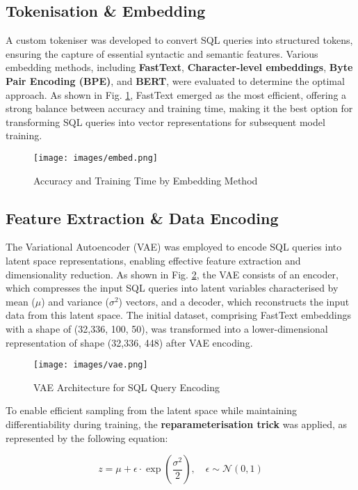 \documentclass[journal]{IEEEtran}
\begin{document}
\subsection{Tokenisation \& Embedding}
A custom tokeniser was developed to convert SQL queries into structured tokens, ensuring the capture of essential syntactic and semantic features. Various embedding methods, including \textbf{FastText}, \textbf{Character-level embeddings}, \textbf{Byte Pair Encoding (BPE)}, and \textbf{BERT}, were evaluated to determine the optimal approach. As shown in Fig. \ref{fig:embed_accuracy}, FastText emerged as the most efficient, offering a strong balance between accuracy and training time, making it the best option for transforming SQL queries into vector representations for subsequent model training.

\begin{figure}[H]
    \centering
    \texttt{[image: images/embed.png]}
    \caption{Accuracy and Training Time by Embedding Method}
    \label{fig:embed_accuracy}
\end{figure}

\subsection{Feature Extraction \& Data Encoding}
The Variational Autoencoder (VAE) was employed to encode SQL queries into latent space representations, enabling effective feature extraction and dimensionality reduction. As shown in Fig. \ref{fig:vae_architecture}, the VAE consists of an encoder, which compresses the input SQL queries into latent variables characterised by mean (\(\mu\)) and variance (\(\sigma^2\)) vectors, and a decoder, which reconstructs the input data from this latent space. The initial dataset, comprising FastText embeddings with a shape of (32,336, 100, 50), was transformed into a lower-dimensional representation of shape (32,336, 448) after VAE encoding.

\begin{figure}[H]
    \centering
    \texttt{[image: images/vae.png]}
    \caption{VAE Architecture for SQL Query Encoding}
    \label{fig:vae_architecture}
\end{figure}

To enable efficient sampling from the latent space while maintaining differentiability during training, the \textbf{reparameterisation trick} was applied, as represented by the following equation:

\[
z = \mu + \epsilon \cdot \exp\left(\frac{\sigma^2}{2}\right), \quad \epsilon \sim \mathcal{N}(0,1)
\]
\end{document}
